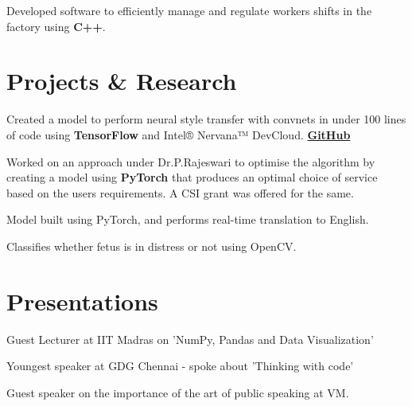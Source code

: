 \documentclass[]{deedy-resume-openfont}
\begin{document}
\begin{minipage}[t]{0.66\textwidth}
    
    \begin{tightemize}
    \item Developed software to efficiently manage and regulate workers shifts in the
    factory using \textbf{C++}.
    \end{tightemize}
    \sectionsep
    
    
    \section{Projects \& Research }
    \runsubsection{}
    Created a model to perform neural style transfer with convnets in under 100 lines of code using \textbf{TensorFlow} and Intel® Nervana™ DevCloud. \textbf{\href{https://github.com/tarunn2799/Neural-Style-Transfer-in-100-lines}{GitHub}}
    \sectionsep
    
    
    Worked on an approach under Dr.P.Rajeswari to optimise the algorithm by creating a model using \textbf{PyTorch} that produces an optimal choice of service based on the users requirements. A CSI grant was offered for the same.
    \sectionsep
    
    Model built using PyTorch, and performs real-time translation to English.
    
    Classifies whether fetus is in distress or not using OpenCV.
    
    
    \sectionsep
    
    \section{Presentations}
    \begin{tightemize}
    \vspace{\topsep}
    \item Guest Lecturer at IIT Madras on 'NumPy, Pandas and Data Visualization'
    \item Youngest speaker at GDG Chennai - spoke about 'Thinking with code'
    \item Guest speaker on the importance of the art of public speaking at VM.
    

\end{tightemize}
\end{minipage}
\end{document}
